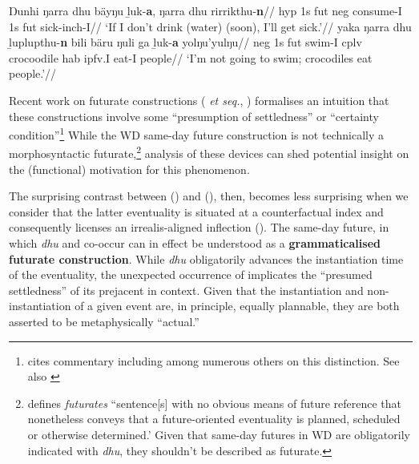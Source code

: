 \pex
\a\begingl\gla Ŋunhi ŋarra dhu bäyŋu ḻuk-\textbf{a}, ŋarra dhu rirrikthu-\textbf{n}//
\glb \gls{hyp} 1s \gls{fut} \gls{neg} consume-\gls{I} 1s \gls{fut} sick-\gls{inch}-\gls{I}//
\glft`If I don't drink (water) (soon), I'll get sick.'\trailingcitation{[AW~20190409]}//
\endgl
\a\begingl\gla yaka ŋarra dhu ḻuplupthu-\textbf{n} bili bäru ŋuli ga ḻuk-\textbf{a} yolŋu'yulŋu//
\glb \gls{neg} 1s \gls{fut} swim-\gls{I} \gls{cplv} crocoodile \gls{hab} \gls{ipfv}.\gls{I} eat-\gls{I} people//
\glft`I'm not going to swim; crocodiles eat people.'\trailingcitation{[AW~20190428]}//
\endgl\xe

Recent work on futurate constructions (\citealp[see e.g.,][]{Copley2009,Copley2008a} \textit{et seq.}, \citealp{Kaufmann2002,Kaufmann2005}) formalises an intuition that these constructions involve some ``presumption of settledness'' or ``certainty condition''\footnote{\citet{Kaufmann2002} cites commentary including \citet{Dowty1979,Comrie1985} among numerous others on this distinction. See also \citet[note 1]{Copley2008a}} While the WD same-day future construction is not technically a morphosyntactic futurate,\footnote{\citet[261]{Copley2008a} defines \textit{futurates} ``sentence[s] with no obvious means of future reference that nonetheless conveys that a future-oriented eventuality is planned, scheduled or otherwise determined.' Given that same-day futures in WD are obligatorily indicated with \textit{dhu}, they shouldn't be described as futurate.} analysis of these devices can shed potential insight on the (functional) motivation for this phenomenon.

The surprising contrast between () and (), then, becomes less surprising when we consider that the latter eventuality is situated at a counterfactual index and consequently licenses an irrealis-aligned inflection (\II). The same-day future, in which \textit{dhu} and \I{} co-occur can in effect be understood as a \textbf{grammaticalised futurate construction}. While \textit{dhu} obligatorily advances the instantiation time of the eventuality, the unexpected occurrence of \I{} implicates the ``presumed settledness'' of its prejacent in context. Given that the instantiation and non-instantiation of a given event are, in principle, equally plannable, they are both asserted to be metaphysically ``actual.''

